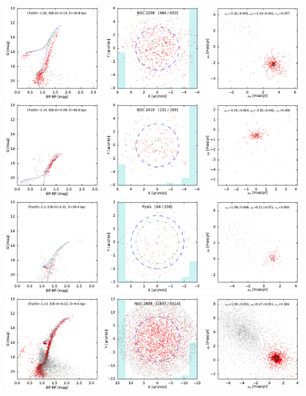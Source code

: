 \documentclass[usenatbib]{mnras}
\begin{document}
\clearpage\begin{figure}
\contcaption{}
\includegraphics{figs/NGC_2298.pdf}
\includegraphics{figs/NGC_2419.pdf}
\includegraphics{figs/Pyxis.pdf}
\includegraphics{figs/NGC_2808.pdf}
\end{figure}
\end{document}
